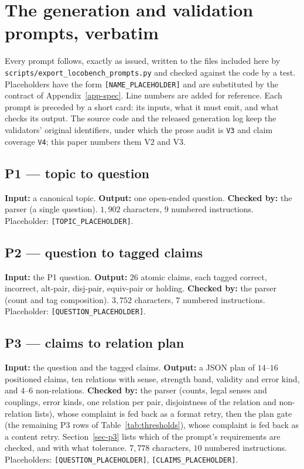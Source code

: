 \section{The generation and validation prompts, verbatim}
\label{app-prompts}

Every prompt follows, exactly as issued, written to the files included here by
\texttt{scripts/export\_locobench\_prompts.py} and checked against the code by a test. Placeholders have the form
\verb|[NAME_PLACEHOLDER]| and are substituted by the contract of Appendix~\ref{app-spec}. Line numbers are added for
reference. Each prompt is preceded by a short card: its inputs, what it must emit, and what checks its output. The source code and the released generation log keep the
validators' original identifiers, under which the prose audit is \texttt{V3} and claim coverage \texttt{V4}; this paper
numbers them V2 and V3.

\subsection{P1 --- topic to question}
\label{app-p1}
\textbf{Input:} a canonical topic. \textbf{Output:} one open-ended question. \textbf{Checked by:} the parser (a single
question). $1{,}902$ characters, $9$ numbered instructions. Placeholder: \verb|[TOPIC_PLACEHOLDER]|.

\subsection{P2 --- question to tagged claims}
\label{app-p2}
\textbf{Input:} the P1 question. \textbf{Output:} $26$ atomic claims, each tagged correct, incorrect, alt-pair,
disj-pair, equiv-pair or holding. \textbf{Checked by:} the parser (count and tag composition). $3{,}752$ characters, $7$
numbered instructions. Placeholder: \verb|[QUESTION_PLACEHOLDER]|.

\subsection{P3 --- claims to relation plan}
\label{app-p3}
\textbf{Input:} the question and the tagged claims. \textbf{Output:} a JSON plan of $14$--$16$ positioned claims, ten
relations with sense, strength band, validity and error kind, and $4$--$6$ non-relations. \textbf{Checked by:} the parser
(counts, legal senses and couplings, error kinds, one relation per pair, disjointness of the relation and
non-relation lists), whose complaint is fed back as a format retry, then the plan gate (the remaining P3 rows of
Table~\ref{tab:thresholds}), whose complaint is fed back as a content retry. Section~\ref{sec-p3} lists which of the
prompt's requirements are checked, and with what tolerance. $7{,}778$ characters, $10$ numbered
instructions. Placeholders: \verb|[QUESTION_PLACEHOLDER]|, \verb|[CLAIMS_PLACEHOLDER]|.

